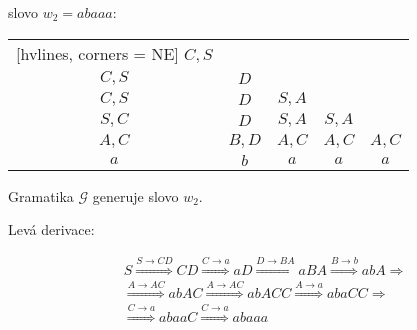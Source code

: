 \begin{minipage}{0.5\textwidth}
    slovo $w_2 = abaaa$: 
    
    \begin{NiceTabular}{ccccc}[hvlines, corners = NE] %
        $C,S$ &   &   &   &   \\ 
        $C, S$ & $D$ &   &   &   \\ 
        $C,S$ & $D$ & $S,A$ &   &   \\ 
        $S,C$ & $D$ & $S,A$ & $S,A$ &   \\ 
        $A,C$ & $B, D$ & $A,C$ & $A,C$ & $A,C$ \\ 
        $a$ & $b$ & $a$ & $a$ & $a$ \\ 
    \end{NiceTabular}
    


        \vspace*{2mm}
        Gramatika $\mathcal{G}$ generuje slovo $w_2$. 
        
        \vspace*{3mm}

        Levá derivace: 

            \begin{align*}
                        & S\stackrel{S \rightarrow CD}{\Longrightarrow} CD 
                        \stackrel{C \rightarrow a}{\Longrightarrow} aD 
                        \stackrel{D \rightarrow BA}{\Longrightarrow} aBA  
                        \stackrel{B \rightarrow b}{\Longrightarrow} abA \Longrightarrow\\
                        &\stackrel{A \rightarrow AC}{\Longrightarrow} abAC 
                    \stackrel{A \rightarrow AC}{\Longrightarrow} abACC 
                    \stackrel{A \rightarrow a}{\Longrightarrow} abaCC \Longrightarrow\\
                  &\stackrel{C \rightarrow a}{\Longrightarrow} abaaC 
                    \stackrel{C \rightarrow a}{\Longrightarrow} abaaa
            \end{align*}
        
\end{minipage}\begin{minipage}{0.5\textwidth}
    


\end{minipage}
